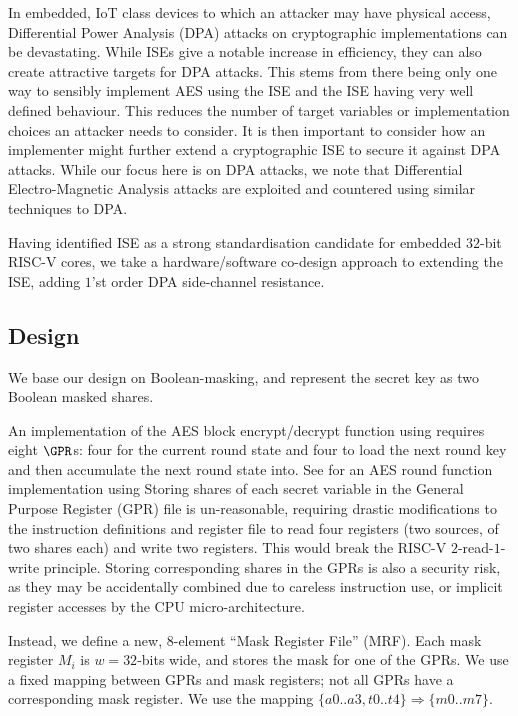 
In embedded, IoT class devices to which an attacker may have
physical access,
Differential Power Analysis (DPA) attacks on cryptographic implementations
\cite{KJJ:99} can be devastating.
While ISEs give a notable increase in efficiency, they can also create
attractive targets for DPA attacks.
This stems from there being only one way to sensibly implement
AES using the ISE and the ISE having very well defined behaviour.
This reduces the number of target variables or
implementation choices an attacker needs to consider.
It is then important to consider how an implementer might
further extend a cryptographic ISE to secure it against DPA attacks.
While our focus here is on DPA attacks, we note that Differential
Electro-Magnetic Analysis attacks are exploited and countered using
similar techniques to DPA.

Having identified ISE  as a strong standardisation candidate
for embedded $32$-bit RISC-V cores, we take a hardware/software co-design
approach to extending the ISE, adding $1$'st order DPA side-channel
resistance.

\subsection{Design}

We base our design on Boolean-masking, and represent the secret
key as two Boolean masked shares.

An implementation of the AES block encrypt/decrypt function 
using  requires eight $\GPR$s:
four for the current round state and
four to load the next round key
and
then accumulate the next round state into.
See  for an AES round function implementation
using 
Storing shares of each secret variable
in the General Purpose Register (GPR) file is un-reasonable,
requiring drastic modifications to the instruction definitions and
register file to read four registers (two sources, of two shares each) and
write two registers.
This would break the RISC-V $2$-read-$1$-write principle.
Storing corresponding shares in the GPRs is also a security
risk, as they may be accidentally combined due to
careless instruction use, or implicit register accesses by the
CPU micro-architecture.

Instead, we define a new, $8$-element ``Mask Register File'' (MRF).
Each mask register $M_i$ is $w=32$-bits wide, and stores the mask for
one of the GPRs.
We use a fixed mapping between GPRs and mask registers;
not all GPRs have a corresponding mask register.
We use the mapping $\{a0..a3,t0..t4\} \Rightarrow \{m0..m7\}$.

